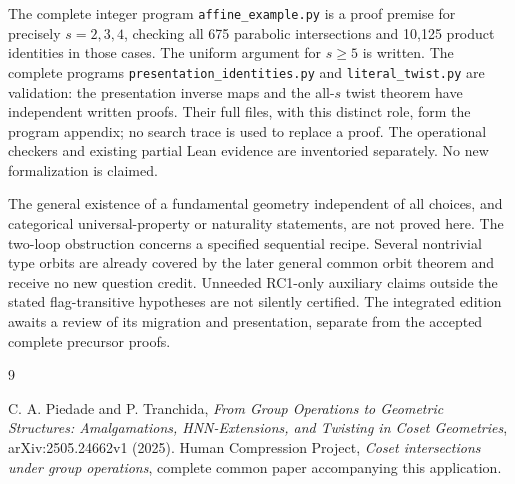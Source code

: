 The complete integer program \texttt{affine\_example.py} is a proof premise for precisely $s=2,3,4$, checking all 675 parabolic intersections and 10,125 product identities in those cases. The uniform argument for $s\geq5$ is written. The complete programs \texttt{presentation\_identities.py} and \texttt{literal\_twist.py} are validation: the presentation inverse maps and the all-$s$ twist theorem have independent written proofs. Their full files, with this distinct role, form the program appendix; no search trace is used to replace a proof. The operational checkers and existing partial Lean evidence are inventoried separately. No new formalization is claimed.

The general existence of a fundamental geometry independent of all choices, and categorical universal-property or naturality statements, are not proved here. The two-loop obstruction concerns a specified sequential recipe. Several nontrivial type orbits are already covered by the later general common orbit theorem and receive no new question credit. Unneeded RC1-only auxiliary claims outside the stated flag-transitive hypotheses are not silently certified. The integrated edition awaits a review of its migration and presentation, separate from the accepted complete precursor proofs.
\begin{thebibliography}{9}\raggedright
{} C. A. Piedade and P. Tranchida, \emph{From Group Operations to Geometric Structures: Amalgamations, HNN-Extensions, and Twisting in Coset Geometries}, arXiv:2505.24662v1 (2025).
 Human Compression Project, \emph{Coset intersections under group operations}, complete common paper accompanying this application.
\end{thebibliography}

